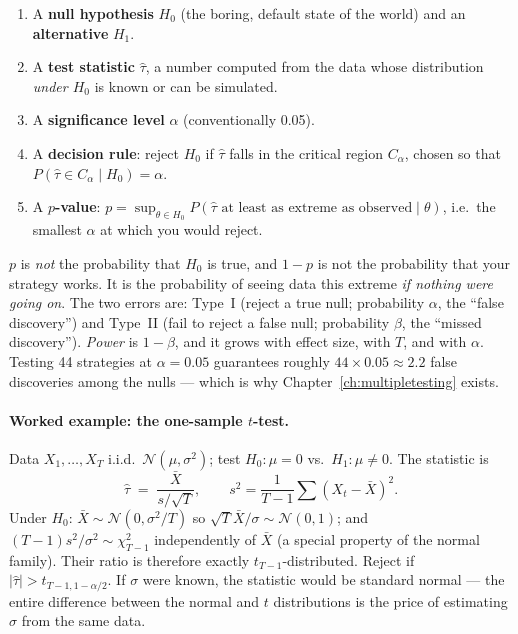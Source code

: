 \begin{enumerate}
  \item A \textbf{null hypothesis} $H_0$ (the boring, default state of the world) and an
    \textbf{alternative} $H_1$.
  \item A \textbf{test statistic} $\hat\tau$, a number computed from the data whose
    distribution \emph{under $H_0$} is known or can be simulated.
  \item A \textbf{significance level} $\alpha$ (conventionally 0.05).
  \item A \textbf{decision rule}: reject $H_0$ if $\hat\tau$ falls in the critical
    region $C_\alpha$, chosen so that $P(\hat\tau\in C_\alpha\mid H_0)=\alpha$.
  \item A \textbf{$p$-value}: $p=\sup_{\theta\in H_0}P(\hat\tau \text{ at least as
    extreme as observed}\mid\theta)$, i.e.\ the smallest $\alpha$ at which you would
    reject.
\end{enumerate}

\begin{remark}
$p$ is \emph{not} the probability that $H_0$ is true, and $1-p$ is not the probability
that your strategy works. It is the probability of seeing data this extreme \emph{if
nothing were going on}. The two errors are: Type~I (reject a true null; probability
$\alpha$, the ``false discovery'') and Type~II (fail to reject a false null;
probability $\beta$, the ``missed discovery''). \emph{Power} is $1-\beta$, and it grows
with effect size, with $T$, and with $\alpha$. Testing 44 strategies at $\alpha=0.05$
guarantees roughly $44\times0.05\approx2.2$ false discoveries among the nulls --- which
is why Chapter~\ref{ch:multipletesting} exists.
\end{remark}

\paragraph{Worked example: the one-sample $t$-test.} Data $X_1,\dots,X_T$ i.i.d.\
$\mathcal N(\mu,\sigma^2)$; test $H_0:\mu=0$ vs.\ $H_1:\mu\ne0$. The statistic is
\[
  \hat\tau \;=\; \frac{\bar X}{s/\sqrt T},\qquad
  s^2=\frac{1}{T-1}\sum(X_t-\bar X)^2 .
\]
Under $H_0$: $\bar X\sim\mathcal N(0,\sigma^2/T)$ so $\sqrt T\bar X/\sigma\sim\mathcal
N(0,1)$; and $(T-1)s^2/\sigma^2\sim\chi^2_{T-1}$ independently of $\bar X$ (a special
property of the normal family). Their ratio is therefore exactly
$t_{T-1}$-distributed. Reject if $|\hat\tau|>t_{T-1,1-\alpha/2}$. If $\sigma$ were
known, the statistic would be standard normal --- the entire difference between the
normal and $t$ distributions is the price of estimating $\sigma$ from the same data.

